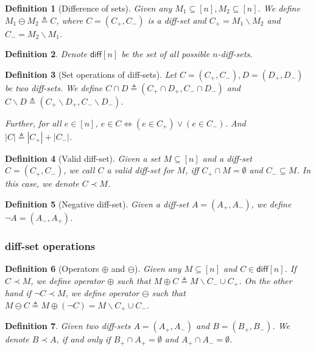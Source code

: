 \documentclass{article}
\newtheorem{define}{Definition}
\newcommand{\diff}{\mathsf{diff}}
\newcommand{\diffvalid}{\prec}
\newcommand{\del}{\backslash}
\begin{document}
\begin{spacing}{1.1}
\begin{define}[Difference of sets]
Given any $M_1\subseteq[n],M_2\subseteq[n]$. We define $M_1\ominus M_2 \triangleq C$, where $C=(C_+,C_-)$ is a diff-set and
$C_+ = M_1 \del M_2$ and $C_- = M_2\del M_1$.
\end{define}

\begin{define}
Denote $\diff[n]$ be the set of all possible $n$-diff-sets.
\end{define}

\begin{define}[Set operations of diff-sets] 
Let $C=(C_+,C_-), D=(D_+,D_-)$ be two diff-sets. 
We define 
$C\cap D \triangleq (C_+\cap D_+, C_-\cap D_-)$
and $C\del D \triangleq (C_+\del D_+, C_-\del D_-)$.

Further, for all $e\in [n]$, $e \in C \Leftrightarrow (e\in C_+)\vee(e\in C_-)$.
And $|C|\triangleq |C_+|+|C_-|$.
\end{define}

\begin{define}[Valid diff-set]
Given a set $M \subseteq [n]$ and a diff-set $C=(C_+,C_-)$, we call $C$ a \emph{valid diff-set} for $M$, iff $C_+ \cap M = \emptyset$ and $C_- \subseteq M$.
In this case, we denote $C\diffvalid M$.
\end{define}

\begin{define}[Negative diff-set]
Given a diff-set $A=(A_+,A_-)$, we define $\neg A=(A_-,A_+)$.
\end{define}


\subsubsection{diff-set operations}

\begin{define}[Operators $\oplus$ and $\ominus$]
Given any $M \subseteq [n]$ and $C \in \diff[n]$.
If $C\diffvalid M$, we define operator $\oplus$ such that $M \oplus C \triangleq M\del C_- \cup C_+ $.
On the other hand if $\neg C\diffvalid M$, we define operator $\ominus$ such that $M \ominus C \triangleq M\oplus (\neg C) = 
M\del C_+ \cup C_- $.
\end{define}


\begin{define}
Given two diff-sets $A=(A_+,A_-)$ and $B=(B_+,B_-)$.
We denote $B \diffvalid A$, if and only if $B_+\cap A_+ = \emptyset$ and $A_+\cap A_-=\emptyset$.
\end{define}


\end{spacing}
\end{document}
